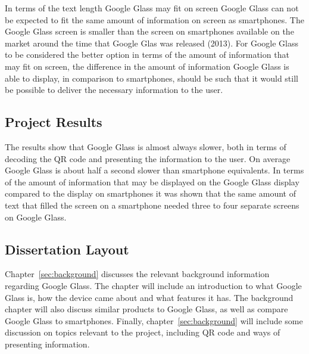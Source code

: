 
In terms of the text length Google Glass may fit on screen Google Glass can not be expected to fit the same amount of information on screen as smartphones. The Google Glass screen is smaller than the screen on smartphones available on the market around the time that Google Glas was released (2013). For Google Glass to be considered the better option in terms of the amount of information that may fit on screen, the difference in the amount of information Google Glass is able to display, in comparison to smartphones, should be such that it would still be possible to deliver the necessary information to the user.

\subsection{Project Results}
The results show that Google Glass is almost always slower, both in terms of decoding the QR code and presenting the information to the user. On average Google Glass is about half a second slower than smartphone equivalents. In terms of the amount of information that may be displayed on the Google Glass display compared to the display on smartphones it was shown that the same amount of text that filled the screen on a smartphone needed three to four separate screens on Google Glass.

\subsection{Dissertation Layout}
Chapter~\ref{sec:background} discusses the relevant background information regarding Google Glass. The chapter will include an introduction to what Google Glass is, how the device came about and what features it has. The background chapter will also discuss similar products to Google Glass, as well as compare Google Glass to smartphones. Finally, chapter~\ref{sec:background} will include some discussion on topics relevant to the project, including QR code and ways of presenting information.

